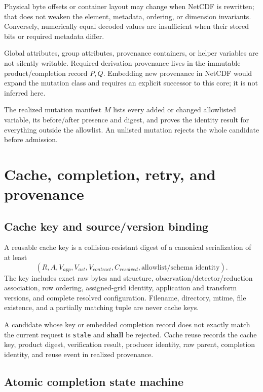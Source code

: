 \documentclass[11pt]{article}
\newcommand{\code}[1]{\texttt{#1}}
\newcommand{\shall}{\textbf{shall}}
\begin{document}
Physical byte offsets or container layout may change when NetCDF is rewritten;
that does not weaken the element, metadata, ordering, or dimension invariants.
Conversely, numerically equal decoded values are insufficient when their
stored bits or required metadata differ.

Global attributes, group attributes, provenance containers, or helper
variables are not silently writable.  Required derivation provenance lives in
the immutable product/completion record $P,Q$.  Embedding new provenance in
NetCDF would expand the mutation class and requires an explicit successor to
this core; it is not inferred here.

The realized mutation manifest $M$ lists every added or changed allowlisted
variable, its before/after presence and digest, and proves the identity result
for everything outside the allowlist.  An unlisted mutation rejects the whole
candidate before admission.

\section{Cache, completion, retry, and provenance}

\subsection{Cache key and source/version binding}

A reusable cache key is a collision-resistant digest of a canonical
serialization of at least
\[
(R,A,V_{app},V_{ast},V_{contract},C_{resolved},
 \text{allowlist/schema identity}).
\]
The key includes exact raw bytes and structure, observation/detector/reduction
association, row ordering, assigned-grid identity, application and transform
versions, and complete resolved configuration.  Filename, directory, mtime,
file existence, and a partially matching tuple are never cache keys.

A candidate whose key or embedded completion record does not exactly match the
current request is \code{stale} and \shall{} be rejected.  Cache reuse records
the cache key, product digest, verification result, producer identity, raw
parent, completion identity, and reuse event in realized provenance.

\subsection{Atomic completion state machine}
\end{document}

